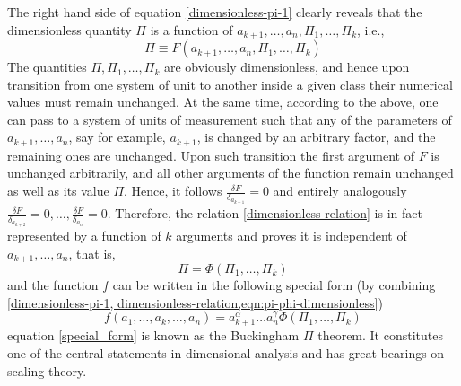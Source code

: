 The right hand side of equation \ref{dimensionless-pi-1} clearly reveals that the dimensionless quantity $\Pi$ is a function of $a_{k+1},\ldots,a_n,\Pi_1,\ldots,\Pi_k$, i.e.,
\begin{equation}
	\Pi \equiv F(a_{k+1}, \ldots, a_n, \Pi_1,\ldots,\Pi_k)
	\label{dimensionless-relation}
\end{equation}
The quantities $\Pi, \Pi_1,\ldots, \Pi_k$ are obviously dimensionless, and hence upon transition from one system of unit to another inside a given class their numerical values must remain unchanged. At the same time, according to the above, one can pass to a system of units of measurement such that any of the parameters of $a_{k+1}, \ldots, a_n$, say for example, $a_{k+1}$, is changed by an arbitrary factor, and the remaining ones are unchanged. Upon such transition the first argument of $F$ is unchanged arbitrarily, and all other arguments of the function remain unchanged as well as its value $\Pi$. Hence, it follows $\frac{\delta F}{\delta_{a_{k+1}}} = 0$ and entirely analogously $\frac{\delta F}{\delta_{a_{k+2}}} = 0, \ldots , \frac{\delta F}{\delta_{a_n}}=0$. Therefore, the relation \ref{dimensionless-relation} is in fact represented by a function of $k$ arguments and proves it is independent of $a_{k+1}, \ldots, a_n$, that is,
\begin{equation}
	\Pi = \Phi(\Pi_1, \ldots, \Pi_k)
	\label{eqn:pi-phi-dimensionless}
\end{equation}
and the function $f$ can be written in the following special form (by combining \ref{dimensionless-pi-1, dimensionless-relation,eqn:pi-phi-dimensionless})
\begin{equation}
f(a_1,\ldots,a_k,\ldots,a_n) = a^{\alpha}_{k+1} \ldots a^{\gamma}_n \Phi(\Pi_1, \ldots, \Pi_k)
\label{special_form}
\end{equation}
equation \ref{special_form} is known as the Buckingham $\Pi$ theorem. It constitutes one of the central statements in dimensional analysis and has great bearings on scaling theory. 
